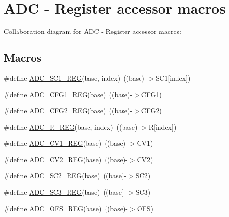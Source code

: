\hypertarget{group___a_d_c___register___accessor___macros}{}\section{A\+DC -\/ Register accessor macros}
\label{group___a_d_c___register___accessor___macros}
Collaboration diagram for A\+DC -\/ Register accessor macros\+:
\subsection*{Macros}
\begin{DoxyCompactItemize}
\item 
\#define \hyperlink{group___a_d_c___register___accessor___macros_ga1b28fcb3112387441ecc5fe9251a32e9}{A\+D\+C\+\_\+\+S\+C1\+\_\+\+R\+EG}(base,  index)~((base)-\/$>$S\+C1\mbox{[}index\mbox{]})
\item 
\#define \hyperlink{group___a_d_c___register___accessor___macros_gaa64d6563b96bb9c13693c466528decd7}{A\+D\+C\+\_\+\+C\+F\+G1\+\_\+\+R\+EG}(base)~((base)-\/$>$C\+F\+G1)
\item 
\#define \hyperlink{group___a_d_c___register___accessor___macros_gad5bd555e9653cefc30e9fdb2834f7a57}{A\+D\+C\+\_\+\+C\+F\+G2\+\_\+\+R\+EG}(base)~((base)-\/$>$C\+F\+G2)
\item 
\#define \hyperlink{group___a_d_c___register___accessor___macros_gaecd126e0e0812785b36331de88019dde}{A\+D\+C\+\_\+\+R\+\_\+\+R\+EG}(base,  index)~((base)-\/$>$R\mbox{[}index\mbox{]})
\item 
\#define \hyperlink{group___a_d_c___register___accessor___macros_ga8b184f4f094f655e551a528ee645df65}{A\+D\+C\+\_\+\+C\+V1\+\_\+\+R\+EG}(base)~((base)-\/$>$C\+V1)
\item 
\#define \hyperlink{group___a_d_c___register___accessor___macros_gac443a67da1afc78c3f8a34426efd7fdc}{A\+D\+C\+\_\+\+C\+V2\+\_\+\+R\+EG}(base)~((base)-\/$>$C\+V2)
\item 
\#define \hyperlink{group___a_d_c___register___accessor___macros_gad5003f0c5ed33b3daec5b49706c8268a}{A\+D\+C\+\_\+\+S\+C2\+\_\+\+R\+EG}(base)~((base)-\/$>$S\+C2)
\item 
\#define \hyperlink{group___a_d_c___register___accessor___macros_ga94ca7e6b360271a225562fa44f605ff8}{A\+D\+C\+\_\+\+S\+C3\+\_\+\+R\+EG}(base)~((base)-\/$>$S\+C3)
\item 
\#define \hyperlink{group___a_d_c___register___accessor___macros_gaa0bc592fecd8cd8d03746f4ccf5e3225}{A\+D\+C\+\_\+\+O\+F\+S\+\_\+\+R\+EG}(base)~((base)-\/$>$O\+FS)

\end{DoxyCompactItemize}
